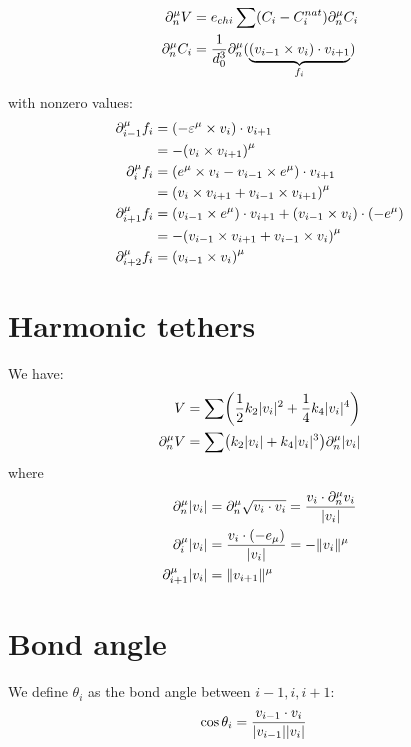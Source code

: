 \documentclass{article}
\DeclarePairedDelimiter{\brk}{(}{)}
\DeclarePairedDelimiter{\norm}{\lvert}{\rvert}
\DeclarePairedDelimiter{\normed}{\lVert}{\rVert}
\newcommand{\cross}{\times}
\begin{document}
  \begin{align*}
    \partial_n^\mu V &= e_{chi} \sum (C_i - C_i^{nat}) \partial_n^\mu C_i\\
    \partial_n^\mu C_i &= \frac{1}{d_0^3} \partial_n^\mu \brk{\underbrace{\brk*{v_{i-1} \cross v_i} \cdot v_{i+1}}_{f_i}}
  \end{align*}

  with nonzero values:
  \begin{align*}
    \partial_{i-1}^\mu f_i &= \brk*{-\varepsilon^\mu \cross v_i} \cdot v_{i+1}\\
    &= -\brk*{v_i \cross v_{i+1}}^\mu\\
    \partial_i^\mu f_i &= \brk*{e^\mu \cross v_i - v_{i-1} \cross e^\mu} \cdot v_{i+1}\\
    &= \brk*{v_i \cross v_{i+1} + v_{i-1} \cross v_{i+1}}^\mu\\
    \partial_{i+1}^\mu f_i &= \brk*{v_{i-1} \cross e^\mu} \cdot v_{i+1} + \brk*{v_{i-1} \cross v_i} \cdot \brk*{-e^\mu}\\
    &= -\brk*{v_{i-1} \cross v_{i+1} + v_{i-1} \cross v_i}^\mu\\
    \partial_{i+2}^\mu f_i &= \brk*{v_{i-1} \cross v_i}^\mu
  \end{align*}

  \section*{Harmonic tethers}
  We have:
  \begin{align*}
    V &= \sum \brk*{\frac{1}{2}k_2 \norm{v_i}^2 + \frac{1}{4}k_4 \norm{v_i}^4}\\
    \partial_n^\mu V &= \sum \brk*{k_2 \norm{v_i} + k_4 \norm{v_i}^3} \partial_n^\mu \norm{v_i}
  \end{align*}
  where
  \begin{align*}
    \partial_n^\mu \norm{v_i} &= \partial_n^\mu \sqrt{v_i \cdot v_i} = \frac{v_i \cdot \partial_n^\mu v_i}{\norm{v_i}}\\
    \partial_i^\mu \norm{v_i} &= \frac{v_i \cdot \brk*{-e_\mu}}{\norm{v_i}}= -\normed{v_i}^\mu\\
    \partial_{i+1}^\mu \norm{v_i} &= \normed{v_{i+1}}^\mu
  \end{align*}

  \section*{Bond angle}
  We define $\theta_i$ as the bond angle between $i-1, i, i+1$:
  \begin{align*}
    &\cos \theta_i = \frac{v_{i-1} \cdot v_i}{\norm*{v_{i-1}} \norm*{v_i}}
  \end{align*}
\end{document}
